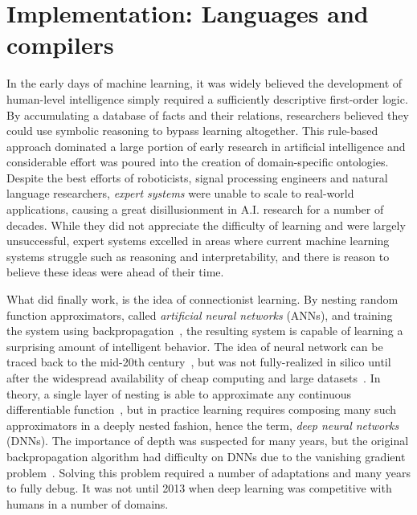 \documentclass[12pt,initial,twoside,maitrise]{dms}
\numberwithin{equation}{section}
\numberwithin{table}{chapter}
\numberwithin{figure}{chapter}
\begin{document}
\section{Implementation: Languages and compilers}

In the early days of machine learning, it was widely believed the development of human-level intelligence simply required a sufficiently descriptive first-order logic. By accumulating a database of facts and their relations, researchers believed they could use symbolic reasoning to bypass learning altogether. This rule-based approach dominated a large portion of early research in artificial intelligence and considerable effort was poured into the creation of domain-specific ontologies. Despite the best efforts of roboticists, signal processing engineers and natural language researchers, \textit{expert systems} were unable to scale to real-world applications, causing a great disillusionment in A.I. research for a number of decades. While they did not appreciate the difficulty of learning and were largely unsuccessful, expert systems excelled in areas where current machine learning systems struggle such as reasoning and interpretability, and there is reason to believe these ideas were ahead of their time.

What did finally work, is the idea of connectionist learning. By nesting random function approximators, called \textit{artificial neural networks} (ANNs), and training the system using backpropagation~\cite{werbos1990backpropagation, rumelhart1988learning}, the resulting system is capable of learning a surprising amount of intelligent behavior. The idea of neural network can be traced back to the mid-20th century~\cite{ivakhnenko1965cybernetic, rosenblatt1958perceptron}, but was not fully-realized in silico until after the widespread availability of cheap computing and large datasets~\cite{lecun2015deep}. In theory, a single layer of nesting is able to approximate any continuous differentiable function~\cite{hornik1989multilayer}, but in practice learning requires composing many such approximators in a deeply nested fashion, hence the term, \textit{deep neural networks} (DNNs). The importance of depth was suspected for many years, but the original backpropagation algorithm had difficulty on DNNs due to the vanishing gradient problem~\cite{bengio1994learning}. Solving this problem required a number of adaptations and many years to fully debug. It was not until 2013 when deep learning was competitive with humans in a number of domains.
\end{document}
